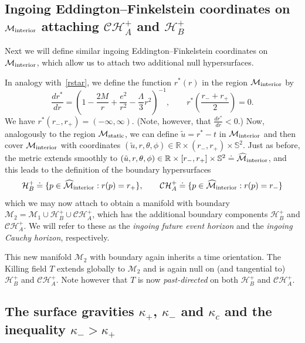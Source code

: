 \documentclass[A4,10pt]{article}
\begin{document}
\subsection{Ingoing Eddington--Finkelstein coordinates on $\mathcal{M}_{\rm interior}$
attaching $\mathcal{CH}^+_A$ and $\mathcal{H}^+_B$}
\label{ingoingcoorsec}

Next we will define similar ingoing Eddington--Finkelstein coordinates on 
 $\mathcal{M}_{{\rm interior}}$, which allow us to attach two additional null hypersurfaces.


In analogy with~\eqref{rstar}, we define the function $r^*(r)$ in the region 
$\mathcal{M}_{{\rm interior}}$ by
 \begin{equation}\label{rstar2}
\frac{dr^*}{dr} = \left(1 - \frac{2M}{r} +\frac{e^2}{r^2} - \frac{\Lambda}{3}r^2\right)^{-1},\qquad r^*\left(\frac{r_-+r_+}{2}\right) = 0.
\end{equation}
We have $r^*(r_-,r_+) = (-\infty,\infty)$. (Note, however, that $\frac{dr^*}{dr} < 0$.) Now, analogously to the region $\mathcal{M}_{{\rm static}}$, we can define $\tilde u = r^*-t$ in 
$\mathcal{M}_{{\rm interior}}$ and then cover $\mathcal{M}_{{\rm interior}}$ with 
coordinates $(\tilde u,r,\theta,\phi) \in \mathbb{R} \times (r_-,r_+) \times \mathbb{S}^2$.  Just as before, the metric extends smoothly to 
$(\tilde u,r,\theta,\phi) \in \mathbb{R} \times [r_-,r_+] \times \mathbb{S}^2\doteq
\widehat{\mathcal{M}}_{\rm interior}$, and this leads to the definition of the boundary
hypersurfaces
\[
\mathcal{H}^+_B \doteq \{p\in \widehat{\mathcal{M}}_{\rm interior}:r(p)=r_+\},\qquad \mathcal{CH}^+_A \doteq \{p\in \widehat{\mathcal{M}}_{\rm interior}:r(p) = r_-\}
\]
which we may now attach to obtain a manifold with boundary $\mathcal{M}_2=\mathcal{M}_1\cup \mathcal{H}^+_B\cup
\mathcal{CH}^+_A$, which has the additional boundary components
$\mathcal{H}^+_B$ and $\mathcal{CH}^+_A$. We will refer to
these as the \emph{ingoing future event horizon} and the \emph{ingoing Cauchy horizon},
respectively.

This new manifold  $\mathcal{M}_2$ with boundary again inherits a time orientation.
The Killing field $T$ extends globally to $\mathcal{M}_2$ and is again null on
(and tangential to) $\mathcal{H}^+_B$ and $\mathcal{CH}^+_A$. Note
however that $T$ is now \emph{past-directed} on both $\mathcal{H}^+_B$ and $\mathcal{CH}^+_A$.
 


\subsection{The surface gravities $\kappa_+$, $\kappa_-$ and $\kappa_c$ and the 
inequality $\kappa_->\kappa_+$}
\end{document}
